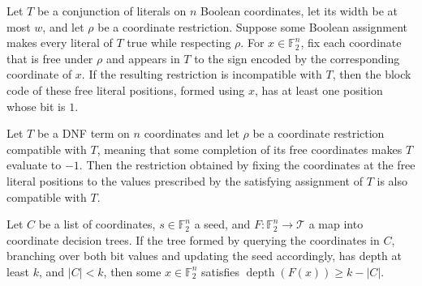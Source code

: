 \begin{theorem}
\label{FABL.DNFTerm.blockCode_nonzero_of_not_compatible}
\leanok
{}
Let $T$ be a conjunction of literals on $n$ Boolean coordinates, let its width be at
most $w$, and let $\rho$ be a coordinate restriction. Suppose some Boolean assignment
makes every literal of $T$ true while respecting $\rho$. For $x\in\mathbb{F}_2^n$, fix
each coordinate that is free under $\rho$ and appears in $T$ to the sign encoded by the
corresponding coordinate of $x$. If the resulting restriction is incompatible with $T$,
then the block code of these free literal positions, formed using $x$, has at least one
position whose bit is $1$.
\end{theorem}

\begin{theorem}
\label{FABL.DNFTerm.satisfyingExtension_compatible}
\leanok
{}
Let $T$ be a DNF term on $n$ coordinates and let $\rho$ be a coordinate restriction
compatible with $T$, meaning that some completion of its free coordinates makes $T$
evaluate to $-1$. Then the restriction obtained by fixing the coordinates at the free
literal positions to the values prescribed by the satisfying assignment of $T$ is also
compatible with $T$.
\end{theorem}

\begin{theorem}
\label{FABL.CoordinateDecisionTree.exists_finish_depth_ge_sub_of_depth_queryCoordinates}
\leanok
{}
Let $C$ be a list of coordinates, $s\in\mathbb{F}_2^n$ a seed, and
$F:\mathbb{F}_2^n\to\mathcal{T}$ a map into coordinate decision trees. If the tree
formed by querying the coordinates in $C$, branching over both bit values and updating
the seed accordingly, has depth at least $k$, and $|C|<k$, then some
$x\in\mathbb{F}_2^n$ satisfies $\operatorname{depth}(F(x))\ge k-|C|$.
\end{theorem}


